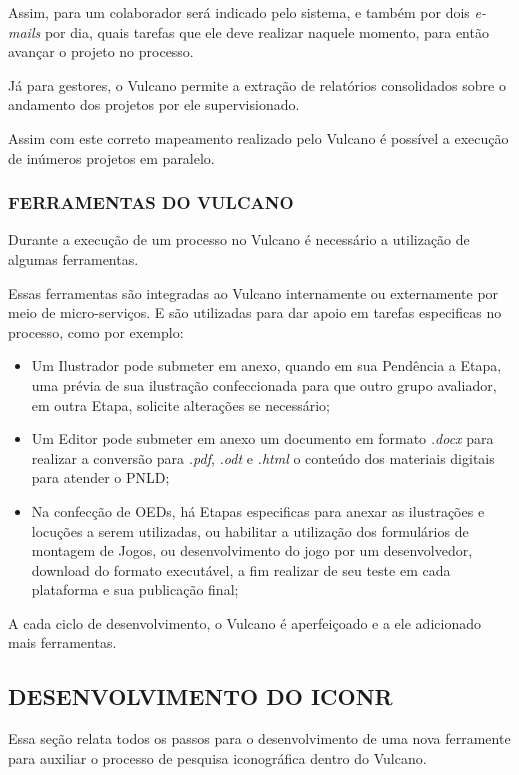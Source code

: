\documentclass[
  12pt,				%
  openany,
  oneside,
  a4paper,			%
  english,			%
  brazil
]{article}
\numberwithin{figure}{section}
\numberwithin{table}{section}
\begin{document}
Assim, para um colaborador será indicado pelo sistema, e também por dois \textit{e-mails} por dia, quais tarefas que ele deve realizar naquele momento, para então avançar o projeto no processo.

Já para gestores, o Vulcano permite a extração de relatórios consolidados sobre o andamento dos projetos por ele supervisionado.

Assim com este correto mapeamento realizado pelo Vulcano é possível a execução de inúmeros projetos em paralelo.


\subsubsection{FERRAMENTAS DO VULCANO}

Durante a execução de um processo no Vulcano é necessário a utilização de algumas ferramentas. 

Essas ferramentas são integradas ao Vulcano internamente ou externamente por meio de micro-serviços. E são utilizadas para dar apoio em tarefas especificas no processo, como por exemplo:

\begin{itemize}
	\item Um Ilustrador pode submeter em anexo, quando em sua Pendência a Etapa, uma prévia de sua ilustração confeccionada para que outro grupo avaliador, em outra Etapa, solicite alterações se necessário;
	\item Um Editor pode submeter em anexo um documento em formato \emph{.docx} para realizar a conversão para \emph{.pdf}, \emph{.odt} e \emph{.html} o conteúdo dos materiais digitais para atender o PNLD;
	\item Na confecção de OEDs, há Etapas especificas para anexar as ilustrações e locuções a serem utilizadas, ou habilitar a utilização dos formulários de montagem de Jogos, ou desenvolvimento do jogo por um desenvolvedor, download do formato executável, a fim realizar de seu teste em cada plataforma e sua publicação final;
\end{itemize}

A cada ciclo de desenvolvimento, o Vulcano é aperfeiçoado e a ele adicionado mais ferramentas.


\subsection{DESENVOLVIMENTO DO ICONR}

Essa seção relata todos os passos para o desenvolvimento de uma nova ferramente para auxiliar o processo de pesquisa iconográfica dentro do Vulcano.
\end{document}
